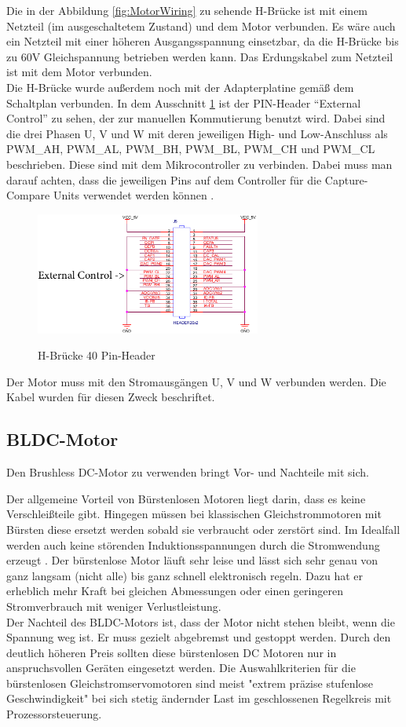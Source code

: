 Die in der Abbildung \ref{fig:MotorWiring} zu sehende H-Brücke ist mit einem Netzteil (im ausgeschaltetem Zustand) und dem Motor verbunden. Es wäre auch ein Netzteil mit einer höheren Ausgangsspannung einsetzbar, da die H-Brücke bis zu 60V Gleichspannung betrieben werden kann. Das Erdungskabel zum Netzteil ist mit dem Motor verbunden. \\
Die H-Brücke wurde außerdem noch mit der Adapterplatine gemäß dem Schaltplan verbunden. In dem Ausschnitt \ref{fig:TIWiring} ist der PIN-Header "`External Control"' zu sehen, der zur manuellen Kommutierung benutzt wird. Dabei sind die drei Phasen U, V und W mit deren jeweiligen High- und Low-Anschluss als PWM\_AH, PWM\_AL, PWM\_BH, PWM\_BL, PWM\_CH und PWM\_CL beschrieben. Diese sind mit dem Mikrocontroller zu verbinden. Dabei muss man darauf achten, dass die jeweiligen Pins auf dem Controller für die Capture-Compare Units verwendet werden können \cite{InfineonTechnologies2016}.
\begin{figure}
    \includegraphics[width=0.66\textwidth]{motor/TI_Wiring.png}
    \caption{H-Brücke 40 Pin-Header}
    \quelle \cite{Instruments2014}
    \label{fig:TIWiring}
\end{figure}
Der Motor muss mit den Stromausgängen U, V und W verbunden werden. Die Kabel wurden für diesen Zweck beschriftet. \\

\subsection{BLDC-Motor}
Den Brushless DC-Motor zu verwenden bringt Vor- und Nachteile mit sich.

Der allgemeine Vorteil von Bürstenlosen Motoren liegt darin, dass es keine Verschleißteile gibt.
Hingegen müssen bei klassischen Gleichstrommotoren mit Bürsten diese ersetzt werden sobald sie verbraucht oder zerstört sind. Im Idealfall werden auch keine störenden Induktionsspannungen durch die Stromwendung erzeugt \cite{Babiel2014}. Der bürstenlose Motor läuft sehr leise und lässt sich sehr genau von ganz langsam (nicht alle) bis ganz schnell elektronisch regeln. Dazu hat er erheblich mehr Kraft bei gleichen Abmessungen oder einen geringeren Stromverbrauch mit weniger Verlustleistung. \\
Der Nachteil des BLDC-Motors ist, dass der Motor nicht stehen bleibt, wenn die Spannung weg ist. Er muss gezielt abgebremst und gestoppt werden.
Durch den deutlich höheren Preis sollten diese bürstenlosen DC Motoren nur in anspruchsvollen Geräten eingesetzt werden.
Die Auswahlkriterien für die bürstenlosen Gleichstromservomotoren sind meist "extrem präzise stufenlose Geschwindigkeit" bei sich stetig ändernder Last im geschlossenen Regelkreis mit Prozessorsteuerung.

